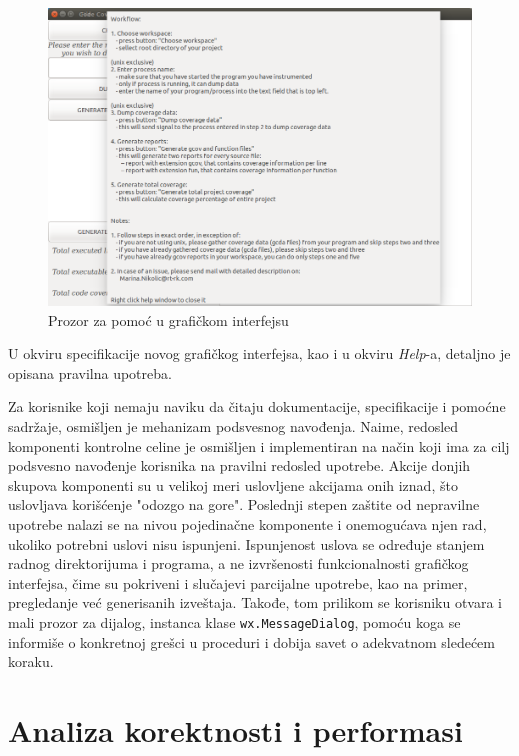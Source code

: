 \documentclass[12pt,oneside]{memoir}
\newcommand{\kod}[1]{\texttt{#1}}
\newcommand{\strano}[1]{\textit{#1}}
\begin{document}
\begin{figure}[!ht]
  \centering
  \includegraphics[width=\textwidth]{img/GUI_4_ng.png}
  \caption{Prozor za pomoć u grafičkom interfejsu}
  \label{fig:GUI4}
\end{figure}
 
U okviru specifikacije novog grafičkog interfejsa, kao i u okviru \strano{Help}-a, detaljno je opisana pravilna upotreba. 

Za korisnike koji nemaju naviku da čitaju dokumentacije, specifikacije i pomoćne sadržaje, osmišljen je mehanizam podsvesnog navođenja. Naime, redosled komponenti kontrolne celine je osmišljen i implementiran na način koji ima za cilj podsvesno navođenje korisnika na pravilni redosled upotrebe. Akcije donjih skupova komponenti su u velikoj meri uslovljene akcijama onih iznad, što uslovljava korišćenje "odozgo na gore". Poslednji stepen zaštite od nepravilne upotrebe nalazi se na nivou pojedinačne komponente i onemogućava njen rad, ukoliko potrebni uslovi nisu ispunjeni. Ispunjenost uslova se određuje stanjem radnog direktorijuma i programa, a ne izvršenosti funkcionalnosti grafičkog interfejsa, čime su pokriveni i slučajevi parcijalne upotrebe, kao na primer, pregledanje već generisanih izveštaja. Takođe, tom prilikom se korisniku otvara i mali prozor za dijalog, instanca klase \kod{wx.MessageDialog}, pomoću koga se informiše o konkretnoj grešci u proceduri i dobija savet o adekvatnom sledećem koraku.


\chapter{Analiza korektnosti i performasi}
\label{chp:testiranje}
\end{document}
